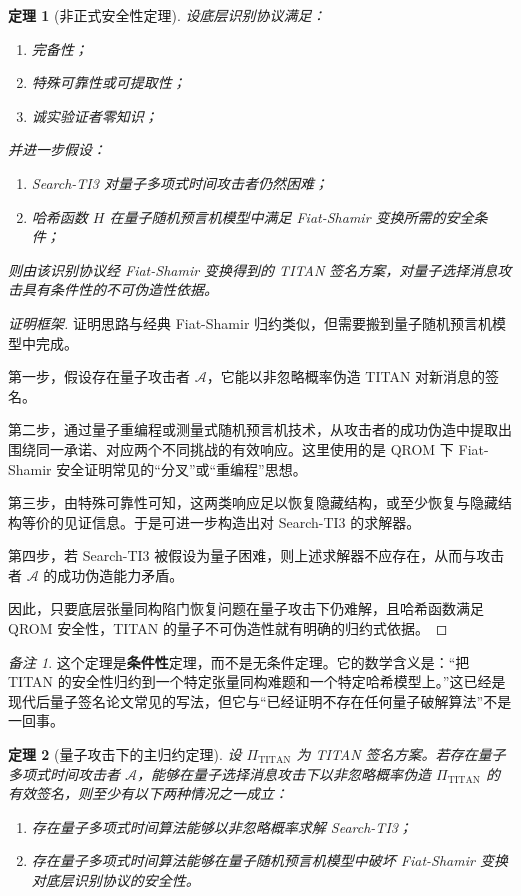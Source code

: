 \documentclass[12pt,a4paper]{article}
\newtheorem{theorem}{定理}[section]
\theoremstyle{remark}
\newtheorem{remark}{备注}[section]
\begin{document}
\begin{theorem}[非正式安全性定理]
设底层识别协议满足：
\begin{enumerate}
    \item 完备性；
    \item 特殊可靠性或可提取性；
    \item 诚实验证者零知识；
\end{enumerate}
并进一步假设：
\begin{enumerate}
    \item Search-TI3 对量子多项式时间攻击者仍然困难；
    \item 哈希函数 $H$ 在量子随机预言机模型中满足 Fiat-Shamir 变换所需的安全条件；
\end{enumerate}
则由该识别协议经 Fiat-Shamir 变换得到的 TITAN 签名方案，对量子选择消息攻击具有条件性的不可伪造性依据。
\end{theorem}

\begin{proof}[证明框架]
证明思路与经典 Fiat-Shamir 归约类似，但需要搬到量子随机预言机模型中完成。

第一步，假设存在量子攻击者 $\mathcal{A}$，它能以非忽略概率伪造 TITAN 对新消息的签名。

第二步，通过量子重编程或测量式随机预言机技术，从攻击者的成功伪造中提取出围绕同一承诺、对应两个不同挑战的有效响应。这里使用的是 QROM 下 Fiat-Shamir 安全证明常见的“分叉”或“重编程”思想。

第三步，由特殊可靠性可知，这两类响应足以恢复隐藏结构，或至少恢复与隐藏结构等价的见证信息。于是可进一步构造出对 Search-TI3 的求解器。

第四步，若 Search-TI3 被假设为量子困难，则上述求解器不应存在，从而与攻击者 $\mathcal{A}$ 的成功伪造能力矛盾。

因此，只要底层张量同构陷门恢复问题在量子攻击下仍难解，且哈希函数满足 QROM 安全性，TITAN 的量子不可伪造性就有明确的归约式依据。
\end{proof}

\begin{remark}
这个定理是\textbf{条件性}定理，而不是无条件定理。它的数学含义是：“把 TITAN 的安全性归约到一个特定张量同构难题和一个特定哈希模型上。”这已经是现代后量子签名论文常见的写法，但它与“已经证明不存在任何量子破解算法”不是一回事。
\end{remark}

\begin{theorem}[量子攻击下的主归约定理]
设 $\Pi_{\mathrm{TITAN}}$ 为 TITAN 签名方案。若存在量子多项式时间攻击者 $\mathcal{A}$，能够在量子选择消息攻击下以非忽略概率伪造 $\Pi_{\mathrm{TITAN}}$ 的有效签名，则至少有以下两种情况之一成立：
\begin{enumerate}
    \item 存在量子多项式时间算法能够以非忽略概率求解 Search-TI3；
    \item 存在量子多项式时间算法能够在量子随机预言机模型中破坏 Fiat-Shamir 变换对底层识别协议的安全性。
\end{enumerate}
\end{theorem}
\end{document}

